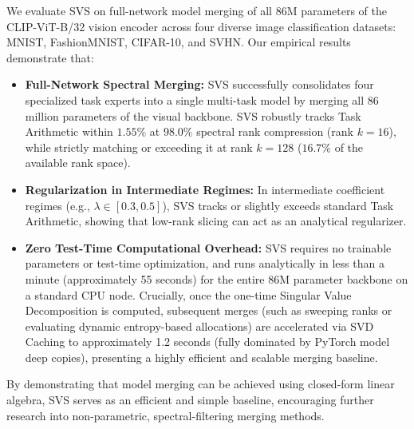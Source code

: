 We evaluate SVS on full-network model merging of all 86M parameters of the CLIP-ViT-B/32 vision encoder across four diverse image classification datasets: MNIST, FashionMNIST, CIFAR-10, and SVHN. Our empirical results demonstrate that:
\begin{itemize}
    \item \textbf{Full-Network Spectral Merging:} SVS successfully consolidates four specialized task experts into a single multi-task model by merging all 86 million parameters of the visual backbone. SVS robustly tracks Task Arithmetic within $1.55\%$ at $98.0\%$ spectral rank compression (rank $k=16$), while strictly matching or exceeding it at rank $k=128$ ($16.7\%$ of the available rank space).
    \item \textbf{Regularization in Intermediate Regimes:} In intermediate coefficient regimes (e.g., $\lambda \in [0.3, 0.5]$), SVS tracks or slightly exceeds standard Task Arithmetic, showing that low-rank slicing can act as an analytical regularizer.
    \item \textbf{Zero Test-Time Computational Overhead:} SVS requires no trainable parameters or test-time optimization, and runs analytically in less than a minute (approximately 55 seconds) for the entire 86M parameter backbone on a standard CPU node. Crucially, once the one-time Singular Value Decomposition is computed, subsequent merges (such as sweeping ranks or evaluating dynamic entropy-based allocations) are accelerated via SVD Caching to approximately 1.2 seconds (fully dominated by PyTorch model deep copies), presenting a highly efficient and scalable merging baseline.
\end{itemize}

By demonstrating that model merging can be achieved using closed-form linear algebra, SVS serves as an efficient and simple baseline, encouraging further research into non-parametric, spectral-filtering merging methods.
